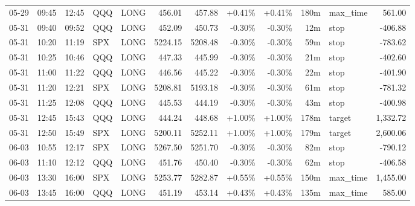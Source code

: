 \documentclass[11pt,a4paper,twoside]{article}
\begin{document}
\begin{center}
\begin{longtable}{>{\color{txtmain}}l l l l l r r r r r >{\color{txtmain}}l r}
05-29 & 09:45 & 12:45 & QQQ & LONG & 456.01 & 457.88 & \textcolor{wingreen}{+0.41\%} & \textcolor{wingreen}{+0.41\%} & 180m & max\_time & \textcolor{wingreen}{561.00} \\
05-31 & 09:40 & 09:52 & QQQ & LONG & 452.09 & 450.73 & \textcolor{lossred}{-0.30\%} & \textcolor{lossred}{-0.30\%} & 12m & stop & \textcolor{lossred}{-406.88} \\
05-31 & 10:20 & 11:19 & SPX & LONG & 5224.15 & 5208.48 & \textcolor{lossred}{-0.30\%} & \textcolor{lossred}{-0.30\%} & 59m & stop & \textcolor{lossred}{-783.62} \\
05-31 & 10:25 & 10:46 & QQQ & LONG & 447.33 & 445.99 & \textcolor{lossred}{-0.30\%} & \textcolor{lossred}{-0.30\%} & 21m & stop & \textcolor{lossred}{-402.60} \\
05-31 & 11:00 & 11:22 & QQQ & LONG & 446.56 & 445.22 & \textcolor{lossred}{-0.30\%} & \textcolor{lossred}{-0.30\%} & 22m & stop & \textcolor{lossred}{-401.90} \\
05-31 & 11:20 & 12:21 & SPX & LONG & 5208.81 & 5193.18 & \textcolor{lossred}{-0.30\%} & \textcolor{lossred}{-0.30\%} & 61m & stop & \textcolor{lossred}{-781.32} \\
05-31 & 11:25 & 12:08 & QQQ & LONG & 445.53 & 444.19 & \textcolor{lossred}{-0.30\%} & \textcolor{lossred}{-0.30\%} & 43m & stop & \textcolor{lossred}{-400.98} \\
05-31 & 12:45 & 15:43 & QQQ & LONG & 444.24 & 448.68 & \textcolor{wingreen}{+1.00\%} & \textcolor{wingreen}{+1.00\%} & 178m & target & \textcolor{wingreen}{1,332.72} \\
05-31 & 12:50 & 15:49 & SPX & LONG & 5200.11 & 5252.11 & \textcolor{wingreen}{+1.00\%} & \textcolor{wingreen}{+1.00\%} & 179m & target & \textcolor{wingreen}{2,600.06} \\
06-03 & 10:55 & 12:17 & SPX & LONG & 5267.50 & 5251.70 & \textcolor{lossred}{-0.30\%} & \textcolor{lossred}{-0.30\%} & 82m & stop & \textcolor{lossred}{-790.12} \\
06-03 & 11:10 & 12:12 & QQQ & LONG & 451.76 & 450.40 & \textcolor{lossred}{-0.30\%} & \textcolor{lossred}{-0.30\%} & 62m & stop & \textcolor{lossred}{-406.58} \\
06-03 & 13:30 & 16:00 & SPX & LONG & 5253.77 & 5282.87 & \textcolor{wingreen}{+0.55\%} & \textcolor{wingreen}{+0.55\%} & 150m & max\_time & \textcolor{wingreen}{1,455.00} \\
06-03 & 13:45 & 16:00 & QQQ & LONG & 451.19 & 453.14 & \textcolor{wingreen}{+0.43\%} & \textcolor{wingreen}{+0.43\%} & 135m & max\_time & \textcolor{wingreen}{585.00} \\

\end{longtable}
\end{center}
\end{document}
